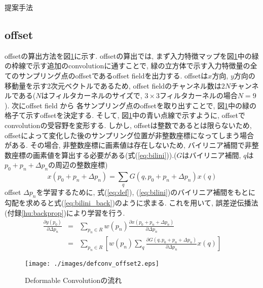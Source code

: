 \begin{chapter}{提案手法}
\subsection{offset}
offsetの算出方法を図\ref{fig:defconv_offset2}に示す. 
offsetの算出では, まず入力特徴マップを図\ref{fig:defconv_offset2}中の緑の枠線で示す追加のconvolutionに通すことで, 緑の立方体で示す入力特徴量の全てのサンプリング点のoffsetであるoffset fieldを出力する. offsetは$x$方向, $y$方向の移動量を示す2次元ベクトルであるため, offset fieldのチャンネル数は$2N$チャンネルである($N$はフィルタカーネルのサイズで, $3\times3$フィルタカーネルの場合$N=9$). 次にoffset field から 各サンプリング点のoffsetを取り出すことで,  図\ref{fig:defconv_offset2}中の緑の格子て示すoffsetを決定する. そして, 図\ref{fig:defconv_offset2}中の青い点線で示すように, offsetでconvolutionの受容野を変形する. しかし, offsetは整数であるとは限らないため, offsetによって変化した後のサンプリング位置が非整数座標になってしまう場合がある. その場合, 非整数座標に画素値は存在しないため, バイリニア補間で非整数座標の画素値を算出する必要がある(式(\ref{eq:bilini})).($G$はバイリニア補間, $q$は$p_0 + p_n + \Delta p_n$の周辺の整数座標) 
\begin{equation}
x(p_0 + p_n + \Delta p_n) = \sum_{q}^{} G(q, p_0 + p_n + \Delta p_n)x(q) \label{eq:bilini}
\end{equation}
offset $\Delta p_n$を学習するために, 式(\ref{eq:def}), (\ref{eq:bilini})のバイリニア補間をもとに勾配を求めると式(\ref{eq:bilini_back})のように求まる. これを用いて, 誤差逆伝播法(付録\ref{hu:backprop})により学習を行う.
\begin{eqnarray}
  \frac{\partial y(p_0)}{\partial \Delta p_n} &=& \sum_{p_n\in R}^{} w(p_n)\frac{\partial x(p_0 + p_n + \Delta p_n)}{\partial \Delta p_n} \nonumber \\
  &=& \sum_{p_n\in R}^{} [w(p_n) \sum_{q}^{} \frac{\partial G(q, p_0 + p_n + \Delta p_n)}{\partial \Delta p_n}x(q)]
  \label{eq:bilini_back}
\end{eqnarray}

\begin{figure}[H]
  \centering
  \texttt{[image: ./images/defconv\_offset2.eps]}
  \caption{Deformable Convolutionの流れ\cite{defconv}}
  \label{fig:defconv_offset2}
\end{figure}


\end{chapter}
